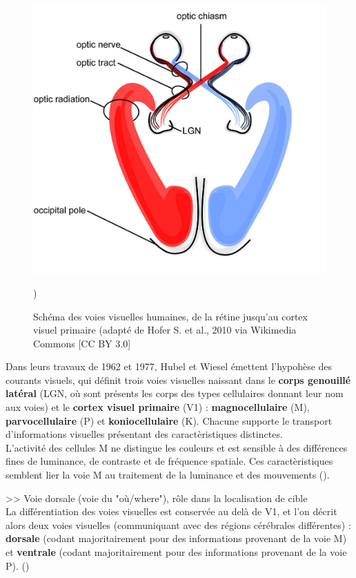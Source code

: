 \begin{figure}[th]
\centering
\includegraphics{Figures/visual_system}
\decoRule %
\caption[Figure]{Schéma des voies visuelles humaines, de la rétine jusqu'au cortex visuel primaire (adapté de Hofer S. et al., 2010 via Wikimedia Commons [CC BY 3.0]})
\label{fig:visual_system}
\end{figure}

Dans leurs travaux de 1962 et 1977, Hubel et Wiesel émettent l'hypohèse des courants visuels, qui définit trois voies visuelles naissant dans le \textbf{corps genouillé latéral} (LGN, où sont présents les corps des types cellulaires donnant leur nom aux voies) et le \textbf{cortex visuel primaire} (V1) :  \textbf{magnocellulaire} (M),  \textbf{parvocellulaire} (P) et  \textbf{koniocellulaire} (K). Chacune supporte le transport d'informations visuelles présentant des caractèristiques distinctes.\\
L'activité des cellules M ne distingue les couleurs et est sensible à des différences fines de luminance, de contraste et de fréquence spatiale. Ces caractèristiques semblent lier la voie M au traitement de la luminance et des mouvements (\cite{Werner2014}).

>> Voie dorsale (voie du "où/where"), rôle dans la localisation de cible\\
La différentiation des voies visuelles est conservée au delà de V1, et l'on décrit alors deux voies visuelles (communiquant avec des régions cérébrales différentes) :  \textbf{dorsale} (codant majoritairement pour des informations provenant de la voie M) et  \textbf{ventrale} (codant majoritairement pour des informations provenant de la voie P). (\cite{Werner2014})

